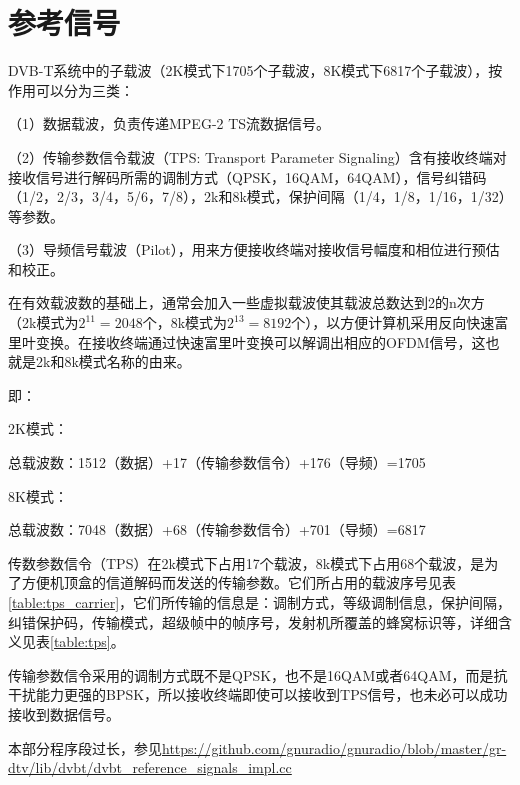 	\section{参考信号}
		\par DVB-T系统中的子载波（2K模式下1705个子载波，8K模式下6817个子载波），按作用可以分为三类：
		\par （1）数据载波，负责传递MPEG-2 TS流数据信号。
		\par （2）传输参数信令载波（TPS: Transport Parameter Signaling）含有接收终端对接收信号进行解码所需的调制方式（QPSK，16QAM，64QAM），信号纠错码（1/2，2/3，3/4，5/6，7/8），2k和8k模式，保护间隔（1/4，1/8，1/16，1/32）等参数。
		\par （3）导频信号载波（Pilot），用来方便接收终端对接收信号幅度和相位进行预估和校正。
		\par 在有效载波数的基础上，通常会加入一些虚拟载波使其载波总数达到2的n次方（2k模式为$2^{11}=2048$个，8k模式为$2^{13}=8192$个），以方便计算机采用反向快速富里叶变换。在接收终端通过快速富里叶变换可以解调出相应的OFDM信号，这也就是2k和8k模式名称的由来。
		\par 即：
		\par 2K模式：
		\par 总载波数：1512（数据）+17（传输参数信令）+176（导频）=1705
		\par 8K模式：
		\par 总载波数：7048（数据）+68（传输参数信令）+701（导频）=6817
		\par 传数参数信令（TPS）在2k模式下占用17个载波，8k模式下占用68个载波，是为了方便机顶盒的信道解码而发送的传输参数。它们所占用的载波序号见表\ref{table:tps_carrier}，它们所传输的信息是：调制方式，等级调制信息，保护间隔，纠错保护码，传输模式，超级帧中的帧序号，发射机所覆盖的蜂窝标识等，详细含义见表\ref{table:tps}。
		
		
		\par 传输参数信令采用的调制方式既不是QPSK，也不是16QAM或者64QAM，而是抗干扰能力更强的BPSK，所以接收终端即使可以接收到TPS信号，也未必可以成功接收到数据信号。
		\par 本部分程序段过长，参见\href{https://github.com/gnuradio/gnuradio/blob/master/gr-dtv/lib/dvbt/dvbt\_reference\_signals\_impl.cc}{https://github.com/gnuradio/gnuradio/blob/master/gr-dtv/lib/dvbt/dvbt\_reference\_signals\_impl.cc}
